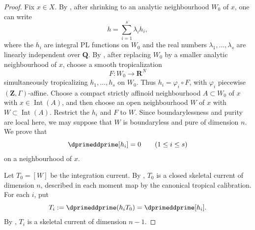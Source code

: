 \begin{proof}
Fix $x\in X$.  By \cite[Proposition~5.8 and Lemma~5.10]{GJR26}, after
shrinking to an analytic neighbourhood $W_0$ of $x$, one can write
\begin{equation}
\label{eq:ch18-zero-current-independent}
                         h=\sum_{i=1}^{s}\lambda_i h_i,
\end{equation}
where the $h_i$ are integral PL functions on $W_0$ and the real numbers
$\lambda_1,\ldots,\lambda_s$ are linearly independent over $\mathbf Q$.
By \cite[Proposition~8.3 and \S8.4]{GJR26}, after replacing $W_0$ by a
smaller analytic neighbourhood of $x$, choose a smooth tropicalization
\[
                         F:W_0\longrightarrow\mathbf R^N
\]
simultaneously tropicalizing $h_1,\ldots,h_s$ on $W_0$.  Thus
$h_i=\varphi_i\circ F$, with $\varphi_i$ piecewise
$(\mathbf Z,\Gamma)$-affine.  Choose a compact strictly affinoid
neighbourhood $A\subset W_0$ of $x$ with $x\in\operatorname{Int}(A)$, and
then choose an open neighbourhood $W$ of $x$ with
$W\subset\operatorname{Int}(A)$.  Restrict the $h_i$ and $F$ to $W$.
Since boundarylessness and purity are local here, we may suppose that $W$
is boundaryless and pure of dimension $n$.  We prove that
\begin{equation}
\label{eq:ch18-zero-current-integral}
                         \dprimeddprime[h_i]=0
                         \qquad(1\leq i\leq s)
\end{equation}
on a neighbourhood of $x$.

Let $T_0=[W]$ be the integration current.  By
\cite[Example~7.5.3]{CLD25}, $T_0$ is a closed skeletal current of dimension
$n$, described in each moment map by the canonical tropical calibration.
For each $i$, put
\[
                         T_i:=\dprimeddprime(h_iT_0)
                             =\dprimeddprime[h_i].
\]
By \cite[Theorem~8.10.3]{CLD25}, $T_i$ is a skeletal current of dimension
$n-1$.


\end{proof}
